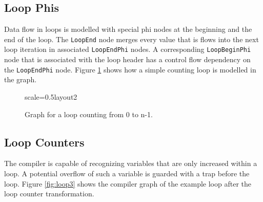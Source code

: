 \documentclass[twocolumn]{svjour3}
\newcommand\nodename[1]{\texttt{#1}}
\begin{document}
\subsection{Loop Phis}
Data flow in loops is modelled with special phi nodes at the beginning and the end of the loop.
The \nodename{LoopEnd} node merges every value that is flows into the next loop iteration in associated \nodename{LoopEndPhi} nodes.
A corresponding \nodename{LoopBeginPhi} node that is associated with the loop header has a control flow dependency on the \nodename{LoopEndPhi} node.
Figure \ref{fig:loop2} shows how a simple counting loop is modelled in the graph.

\begin{figure}[h]
  \label{fig:loop2}
  \centering
\begin{digraphenv}{scale=0.5}{layout2}
\end{digraphenv}
  \caption{Graph for a loop counting from 0 to n-1.}
\end{figure}

\subsection{Loop Counters}
The compiler is capable of recognizing variables that are only increased within a loop.
A potential overflow of such a variable is guarded with a trap before the loop.
Figure \ref{fig:loop3} shows the compiler graph of the example loop after the loop counter transformation.
\end{document}
